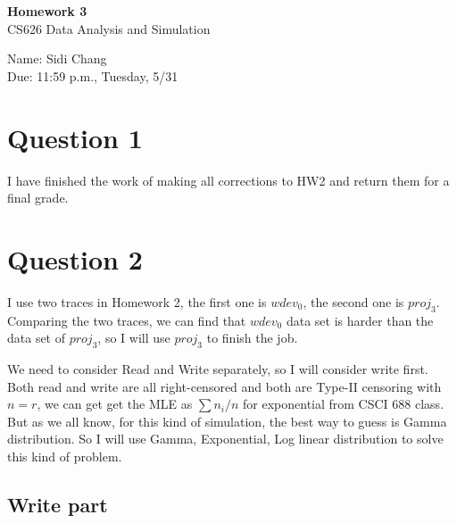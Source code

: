 \documentclass[11pt]{article}
\begin{document}
\pagestyle{empty}

\begin{Large}
\begin{center}
{\bf Homework 3}\\
CS626 Data Analysis and Simulation
\end{center}
\end{Large}
\begin{large}
\begin{center}
Name: Sidi Chang\\
Due: 11:59 p.m., Tuesday, 5/31
\end{center}
\end{large}
\section{Question 1}
I have finished the work of making all corrections to HW2 and return them for a final grade.
\section{Question 2}
I use two traces in Homework 2, the first one is $wdev_0$, the second one is $proj_3$. Comparing the two traces, we can find that $wdev_0$ data set is harder than the data set of $proj_3$, so I will use $proj_3$ to finish the job. 

We need to consider Read and Write separately, so I will consider write first. Both read and write are all right-censored and both are Type-II censoring with $n=r$, we can get get the MLE as $\sum n_i /n$ for exponential from CSCI 688 class. But as we all know, for this kind of simulation, the best way to guess is Gamma distribution. So I will use Gamma, Exponential, Log linear distribution to solve this kind of problem.
\subsection{Write part}
\end{document}
